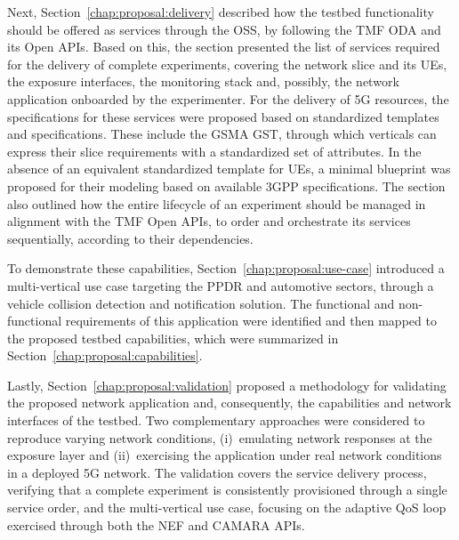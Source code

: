 Next, Section~\ref{chap:proposal:delivery} described how the testbed functionality should be offered as services through the \acs{OSS}, by following the \acs{TMF} \acs{ODA} and its Open \acsp{API}. Based on this, the section presented the list of services required for the delivery of complete experiments, covering the network slice and its \acsp{UE}, the exposure interfaces, the monitoring stack and, possibly, the network application onboarded by the experimenter. For the delivery of \acs{5G} resources, the specifications for these services were proposed based on standardized templates and specifications. These include the \acs{GSMA} \acs{GST}, through which verticals can express their slice requirements with a standardized set of attributes. In the absence of an equivalent standardized template for \acsp{UE}, a minimal blueprint was proposed for their modeling based on available \acs{3GPP} specifications. The section also outlined how the entire lifecycle of an experiment should be managed in alignment with the \acs{TMF} Open \acsp{API}, to order and orchestrate its services sequentially, according to their dependencies.

To demonstrate these capabilities, Section~\ref{chap:proposal:use-case} introduced a multi-vertical use case targeting the \acs{PPDR} and automotive sectors, through a vehicle collision detection and notification solution. The functional and non-functional requirements of this application were identified and then mapped to the proposed testbed capabilities, which were summarized in Section~\ref{chap:proposal:capabilities}. 

Lastly, Section~\ref{chap:proposal:validation} proposed a methodology for validating the proposed network application and, consequently, the capabilities and network interfaces of the testbed. Two complementary approaches were considered to reproduce varying network conditions, (i)~emulating network responses at the exposure layer and (ii)~exercising the application under real network conditions in a deployed \acs{5G} network. The validation covers the service delivery process, verifying that a complete experiment is consistently provisioned through a single service order, and the multi-vertical use case, focusing on the adaptive \acs{QoS} loop exercised through both the \acs{NEF} and CAMARA \acsp{API}.
